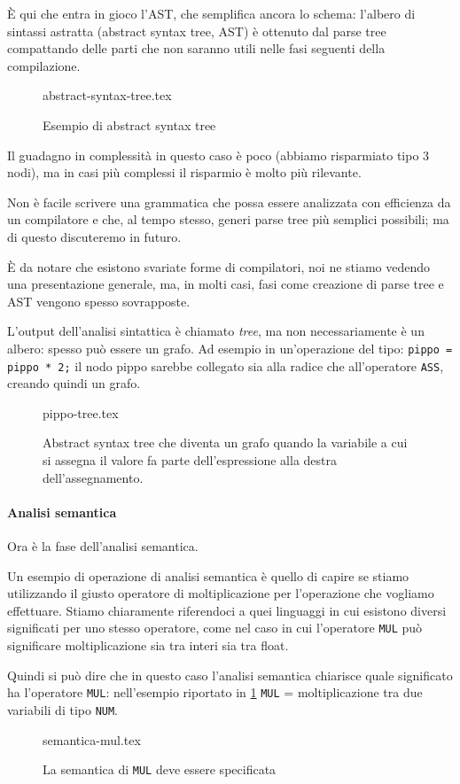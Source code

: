 \documentclass[class=book, crop=false, oneside, 12pt]{standalone}
\begin{document}
È qui che entra in gioco l’AST, che semplifica ancora lo schema: l’albero di sintassi astratta (abstract syntax tree, AST) è ottenuto dal parse tree compattando delle parti che non saranno utili nelle fasi seguenti della compilazione.
\begin{figure}[H]
	\centering
	{abstract-syntax-tree.tex}
	\caption{Esempio di abstract syntax tree}
	\label{esempio_AST}
\end{figure}
Il guadagno in complessità in questo caso è poco (abbiamo risparmiato tipo 3 nodi), ma in casi più complessi il risparmio è molto più rilevante.

Non è facile scrivere una grammatica che possa essere analizzata con efficienza da un compilatore e che, al tempo stesso, generi parse tree più semplici possibili; ma di questo discuteremo in futuro.

È da notare che esistono svariate forme di compilatori, noi ne stiamo vedendo una presentazione generale, ma, in molti casi, fasi come creazione di parse tree e AST vengono spesso sovrapposte.

L’output dell’analisi sintattica è chiamato \emph{tree}, ma non necessariamente è un albero: spesso può essere un grafo. Ad esempio in un’operazione del tipo:
\texttt{pippo = pippo * 2;}
il nodo pippo sarebbe collegato sia alla radice che all’operatore \texttt{ASS}, creando quindi un grafo.
\begin{figure}[H]
	\centering
	{pippo-tree.tex}
	\caption{Abstract syntax tree che diventa un grafo quando la variabile a cui si assegna il valore fa parte dell'espressione alla destra dell'assegnamento.}
	\label{esempio_pippo}
\end{figure}

\paragraph{Analisi semantica}
Ora è la fase dell’analisi semantica.

Un esempio di operazione di analisi semantica è quello di capire se stiamo utilizzando il giusto operatore di moltiplicazione per l’operazione che vogliamo effettuare. Stiamo chiaramente riferendoci a quei linguaggi in cui esistono diversi significati per uno stesso operatore, come nel caso in cui l'operatore \texttt{MUL} può significare moltiplicazione sia tra interi sia tra float.

Quindi si può dire che in questo caso l’analisi semantica chiarisce quale significato ha l’operatore \texttt{MUL}: nell’esempio riportato in \ref{esempio_AST} \texttt{MUL} = moltiplicazione tra due variabili di tipo \texttt{NUM}.
\begin{figure}[H]
	\centering
	{semantica-mul.tex}
	\caption{La semantica di \texttt{MUL} deve essere specificata}
\end{figure}
\end{document}

